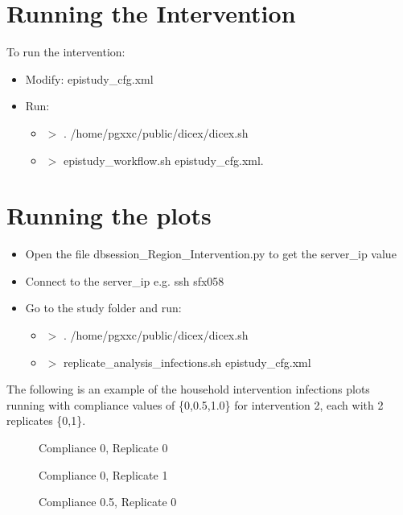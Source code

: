 \documentclass[11pt]{article}
\begin{document}
\section{Running the Intervention} 
To run the intervention: 
\begin{itemize}
\item Modify: epistudy\_cfg.xml
\item Run:
\begin{itemize}
\item $>$ . /home/pgxxc/public/dicex/dicex.sh
\item $>$ epistudy\_workflow.sh epistudy\_cfg.xml.
\end{itemize}
\end{itemize}

\section{Running the plots}
\begin{itemize}
\item Open the file dbsession\_Region\_Intervention.py to get the server\_ip value
\item Connect to the server\_ip e.g. ssh sfx058
\item Go to the study folder and run:
\begin{itemize}
\item $>$ . /home/pgxxc/public/dicex/dicex.sh
\item $>$ replicate\_analysis\_infections.sh epistudy\_cfg.xml
\end{itemize}
\end{itemize}

The following is an example of the household intervention infections plots running with compliance values of \{0,0.5,1.0\} for intervention 2, each with 2 replicates \{0,1\}.
 \begin{figure}[h]
\caption{Compliance 0, Replicate 0}
\label{fig:indemics}
\end{figure}

 \begin{figure}[h]
\caption{Compliance 0, Replicate 1}
\label{fig:indemics}
\end{figure}
 
  \begin{figure}[h]
\caption{Compliance 0.5, Replicate 0}
\label{fig:indemics}
\end{figure}
\end{document}
